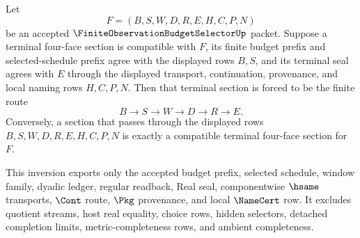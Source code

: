 \begin{theorem}
\label{thm:finite-observation-budget-selector-budget-prefix-pullback-inversion}
Let
$$
F=(B,S,W,D,R,E,H,C,P,N)
$$
be an accepted $\FiniteObservationBudgetSelectorUp$ packet. Suppose a terminal four-face section is compatible with $F$, its finite budget prefix and selected-schedule prefix agree with the displayed rows $B,S$, and its terminal seal agrees with $E$ through the displayed transport, continuation, provenance, and local naming rows $H,C,P,N$. Then that terminal section is forced to be the finite route
$$
B \to S \to W \to D \to R \to E.
$$
Conversely, a section that passes through the displayed rows $B,S,W,D,R,E,H,C,P,N$ is exactly a compatible terminal four-face section for $F$.

This inversion exports only the accepted budget prefix, selected schedule, window family, dyadic ledger, regular readback, Real seal, componentwise $\hsame$ transports, $\Cont$ route, $\Pkg$ provenance, and local $\NameCert$ row. It excludes quotient streams, host real equality, choice rows, hidden selectors, detached completion limits, metric-completeness rows, and ambient completeness.
\end{theorem}
